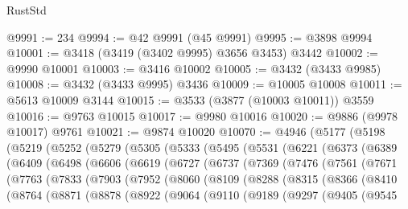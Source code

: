 \begin{lexlean}{RustStd}
\begin{coremodule}
@9991 := 234
@9994 := @42 @9991 (@45 @9991)
@9995 := @3898 @9994
@10001 := @3418 (@3419 (@3402 @9995) @3656 @3453) @3442
@10002 := @9990 @10001
@10003 := @3416 @10002
@10005 := @3432 (@3433 @9985)
@10008 := @3432 (@3433 @9995) @3436
@10009 := @10005 @10008
@10011 := @5613 @10009 @3144
@10015 := @3533 (@3877 (@10003 @10011)) @3559
@10016 := @9763 @10015
@10017 := @9980 @10016
@10020 := @9886 (@9978 @10017) @9761
@10021 := @9874 @10020
@10070 := @4946
    (@5177
      (@5198
        (@5219
          (@5252
            (@5279
              (@5305
                (@5333
                  (@5495
                    (@5531
                      (@6221
                        (@6373
                          (@6389
                            (@6409
                              (@6498
                                (@6606
                                  (@6619
                                    (@6727
                                      (@6737
                                        (@7369
                                          (@7476
                                            (@7561
                                              (@7671
                                                (@7763
                                                  (@7833
                                                    (@7903
                                                      (@7952
                                                        (@8060
                                                          (@8109
                                                            (@8288
                                                              (@8315
                                                                (@8366
                                                                  (@8410
                                                                    (@8764
                                                                      (@8871
                                                                        (@8878
                                                                          (@8922
                                                                            (@9064
                                                                              (@9110
                                                                                (@9189
                                                                                  (@9297
                                                                                    (@9405
                                                                                      (@9545

\end{coremodule}
\end{lexlean}

